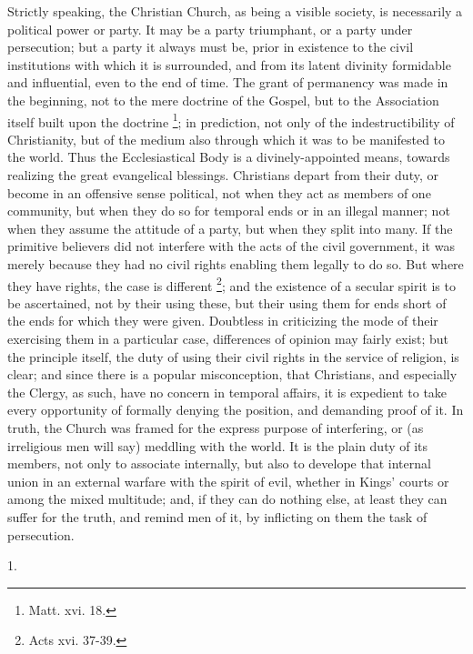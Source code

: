 Strictly speaking, the Christian Church, as being a visible
society, is necessarily a political power or party. It may be a party
triumphant, or a party under persecution; but a party it always must
be, prior in existence to the civil institutions with which it is
surrounded, and from its latent divinity formidable and
influential, even to the end of time. The grant of permanency was made
in the beginning, not to the mere doctrine of the Gospel, but to the
Association itself built upon the doctrine \footnote{Matt. xvi. 18.}; in prediction, not only of the indestructibility of
Christianity, but of the medium also through which it was to be
manifested to the world. Thus the Ecclesiastical Body is a
divinely-appointed means, towards realizing the great evangelical
blessings. Christians depart from their duty, or become in an
offensive sense political, not when they act as members of one
community, but when they do so for temporal ends or in an illegal
manner; not when they assume the attitude of a party, but when they
split into many. If the primitive believers did not interfere with the
acts of the civil government, it was merely because they had no civil
rights enabling them legally to do so. But where they have rights, the
case is different \footnote{Acts xvi. 37-39.}; and
the existence of a secular spirit is to be ascertained, not by their
using these, but their using them for ends short of the ends for which
they were given. Doubtless in criticizing the mode of their exercising
them in a particular case, differences of opinion may fairly exist;
but the principle itself, the duty of using their civil rights in the
service of religion, is clear; and since there is a popular
misconception, that Christians, and especially the Clergy, as such,
have no concern in temporal affairs, it is expedient to take every
opportunity of formally denying the position, and demanding proof of
it. In truth, the Church was framed for the express purpose of
interfering, or (as irreligious men will say) meddling with the world.
It is the plain duty of its members, not only to associate
internally, but also to develope that internal union in an external
warfare with the spirit of evil, whether in Kings' courts or among the
mixed multitude; and, if they can do nothing else, at least they can
suffer for the truth, and remind men of it, by inflicting on them the
task of persecution.

1.

